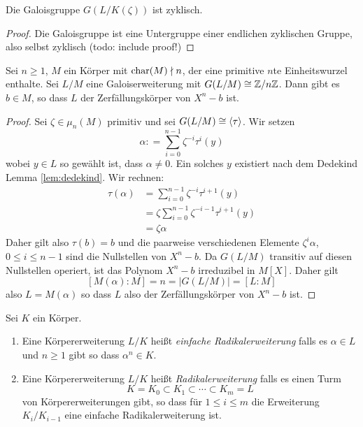 \documentclass{book}
\begin{document}
\begin{cor}
    \label{cor:galzyklisch}
    Die Galoisgruppe $G(L/K(\zeta))$ ist zyklisch.  
\end{cor}
\begin{proof}
    Die Galoisgruppe ist eine Untergruppe einer endlichen zyklischen Gruppe, also selbst
    zyklisch (todo: include proof!)
\end{proof}
\begin{thm}
    \label{thm:radikalzyklisch}
    Sei $n \ge 1$, $M$ ein Körper mit $\operatorname{char}(M) \nmid n$, der eine primitive
    $n$te Einheitswurzel enthalte. Sei $L/M$ eine Galoiserweiterung mit
    $G(L/M) \cong \mathbb{Z}/n\mathbb{Z}$. Dann gibt es $b \in M$, so dass $L$ der
    Zerfällungskörper von $X^n - b$ ist. 
\end{thm}
\begin{proof}
    Sei $\zeta \in \mu_n(M)$ primitiv und sei $G(L/M) \cong \langle \tau \rangle$. Wir
    setzen 
    \[
        \alpha : = \sum_{i = 0}^{n-1} \zeta^{-i} \tau^i(y)
    \]
    wobei $y \in L$ so gewählt ist, dass $\alpha \ne 0$. Ein solches $y$
    existiert nach dem Dedekind Lemma \ref{lem:dedekind}. Wir rechnen:
    \begin{align*}
        \tau(\alpha) & = \sum_{i = 0}^{n-1} \zeta^{-i} \tau^{i+1}(y)\\ 
                     & = \zeta \sum_{i = 0}^{n-1} \zeta^{-i-1} \tau^{i+1}(y)\\
                     & = \zeta \alpha
    \end{align*}
    Daher gilt also $\tau(b) = b$ und die paarweise verschiedenen Elemente
    $\zeta^i\alpha$, $0 \le i \le n-1$ sind die Nullstellen von $X^n - b$. Da
    $G(L/M)$ transitiv auf diesen Nullstellen operiert, ist das Polynom $X^n -
    b$ irreduzibel in $M[X]$. Daher gilt
    \[
        [M(\alpha):M] = n = |G(L/M)| = [L:M]
    \]
    also $L = M(\alpha)$ so dass $L$ also der Zerfällungskörper von $X^n - b$ ist. 
\end{proof}

\begin{defi}
    \label{defi:radikal}
    Sei $K$ ein Körper. 
    \begin{enumerate}
        \item Eine Körpererweiterung $L/K$ heißt {\em einfache
            Radikalerweiterung} falls es $\alpha \in L$ und $n \ge 1$ gibt so
            dass $\alpha^n \in K$. 
        \item Eine Körpererweiterung $L/K$ heißt {\em Radikalerweiterung} falls es einen Turm
            \[
                K = K_0 \subset K_1 \subset \cdots \subset K_m = L
            \]
            von Körpererweiterungen gibt, so dass für $1 \le i \le m$ die
            Erweiterung $K_i/K_{i-1}$ eine einfache Radikalerweiterung ist. 
    \end{enumerate}
\end{defi}
\end{document}
